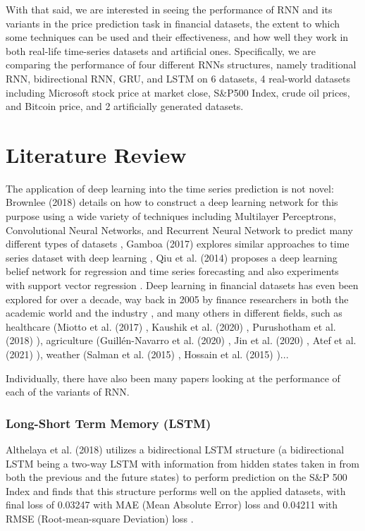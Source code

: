 \documentclass[letterpaper, 10 pt, conference]{ieeeconf}  %
\begin{document}
    With that said, we are interested in seeing the performance of RNN and its variants in the price prediction task in financial datasets, the extent to which some techniques can be used and their effectiveness, and how well they work in both real-life time-series datasets and artificial ones. Specifically, we are comparing the performance of four different RNNs structures, namely traditional RNN, bidirectional RNN, GRU, and LSTM on 6 datasets, 4 real-world datasets including Microsoft stock price at market close, S\&P500 Index, crude oil prices, and Bitcoin price, and 2 artificially generated datasets.

\section{Literature Review}
    The application of deep learning into the time series prediction is not novel: Brownlee (2018) details on how to construct a deep learning network for this purpose using a wide variety of techniques including Multilayer Perceptrons, Convolutional Neural Networks, and Recurrent Neural Network to predict many different types of datasets \cite{brownlee2018}, Gamboa (2017) explores similar approaches to time series dataset with deep learning \cite{gamboa2017deep}, Qiu et al. (2014) proposes a deep learning belief network for regression and time series forecasting and also experiments with support vector regression \cite{7015739}. Deep learning in financial datasets has even been explored for over a decade, way back in 2005 by finance researchers in both the academic world and the industry \cite{SEZER2020106181}, and many others in different fields, such as healthcare (Miotto et al. (2017) \cite{10.1093/bib/bbx044}, Kaushik et al. (2020) \cite{10.3389/fdata.2020.00004}, Purushotham et al. (2018) \cite{PURUSHOTHAM2018112}), agriculture (Guillén-Navarro et al. (2020) \cite{navarro2020}, Jin et al. (2020) \cite{s20051334}, Atef et al. (2021) \cite{9531929}), weather (Salman et al. (2015) \cite{7415154}, Hossain et al. (2015) \cite{7280812})...

    Individually, there have also been many papers looking at the performance of each of the variants of RNN.
    \subsubsection{Long-Short Term Memory (LSTM)}
        Althelaya et al. (2018) utilizes a bidirectional LSTM structure (a bidirectional LSTM being a two-way LSTM with information from hidden states taken in from both the previous and the future states) to perform prediction on the S\&P 500 Index and finds that this structure performs well on the applied datasets, with final loss of 0.03247 with MAE (Mean Absolute Error) loss and 0.04211 with RMSE (Root-mean-square Deviation) loss \cite{8355458}. 
\end{document}
